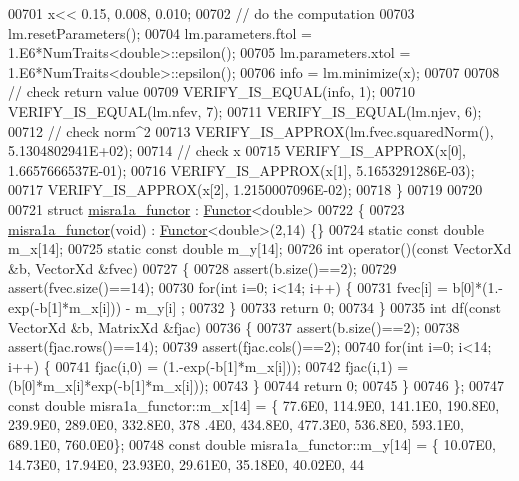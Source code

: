 \begin{DoxyCode}
00701   x<< 0.15, 0.008, 0.010;
00702   \textcolor{comment}{// do the computation}
00703   lm.resetParameters();
00704   lm.parameters.ftol = 1.E6*NumTraits<double>::epsilon();
00705   lm.parameters.xtol = 1.E6*NumTraits<double>::epsilon();
00706   info = lm.minimize(x);
00707 
00708   \textcolor{comment}{// check return value}
00709   VERIFY\_IS\_EQUAL(info, 1);
00710   VERIFY\_IS\_EQUAL(lm.nfev, 7);
00711   VERIFY\_IS\_EQUAL(lm.njev, 6);
00712   \textcolor{comment}{// check norm^2}
00713   VERIFY\_IS\_APPROX(lm.fvec.squaredNorm(), 5.1304802941E+02);
00714   \textcolor{comment}{// check x}
00715   VERIFY\_IS\_APPROX(x[0], 1.6657666537E-01);
00716   VERIFY\_IS\_APPROX(x[1], 5.1653291286E-03);
00717   VERIFY\_IS\_APPROX(x[2], 1.2150007096E-02);
00718 \}
00719 
00720 
00721 \textcolor{keyword}{struct }\hyperlink{structmisra1a__functor}{misra1a\_functor} : \hyperlink{struct_functor}{Functor}<double>
00722 \{
00723     \hyperlink{structmisra1a__functor}{misra1a\_functor}(\textcolor{keywordtype}{void}) : \hyperlink{struct_functor}{Functor}<double>(2,14) \{\}
00724     \textcolor{keyword}{static} \textcolor{keyword}{const} \textcolor{keywordtype}{double} m\_x[14];
00725     \textcolor{keyword}{static} \textcolor{keyword}{const} \textcolor{keywordtype}{double} m\_y[14];
00726     \textcolor{keywordtype}{int} operator()(\textcolor{keyword}{const} VectorXd &b, VectorXd &fvec)
00727     \{
00728         assert(b.size()==2);
00729         assert(fvec.size()==14);
00730         \textcolor{keywordflow}{for}(\textcolor{keywordtype}{int} i=0; i<14; i++) \{
00731             fvec[i] = b[0]*(1.-exp(-b[1]*m\_x[i])) - m\_y[i] ;
00732         \}
00733         \textcolor{keywordflow}{return} 0;
00734     \}
00735     \textcolor{keywordtype}{int} df(\textcolor{keyword}{const} VectorXd &b, MatrixXd &fjac)
00736     \{
00737         assert(b.size()==2);
00738         assert(fjac.rows()==14);
00739         assert(fjac.cols()==2);
00740         \textcolor{keywordflow}{for}(\textcolor{keywordtype}{int} i=0; i<14; i++) \{
00741             fjac(i,0) = (1.-exp(-b[1]*m\_x[i]));
00742             fjac(i,1) = (b[0]*m\_x[i]*exp(-b[1]*m\_x[i]));
00743         \}
00744         \textcolor{keywordflow}{return} 0;
00745     \}
00746 \};
00747 \textcolor{keyword}{const} \textcolor{keywordtype}{double} misra1a\_functor::m\_x[14] = \{ 77.6E0, 114.9E0, 141.1E0, 190.8E0, 239.9E0, 289.0E0, 332.8E0, 378
      .4E0, 434.8E0, 477.3E0, 536.8E0, 593.1E0, 689.1E0, 760.0E0\};
00748 \textcolor{keyword}{const} \textcolor{keywordtype}{double} misra1a\_functor::m\_y[14] = \{ 10.07E0, 14.73E0, 17.94E0, 23.93E0, 29.61E0, 35.18E0, 40.02E0, 44

\end{DoxyCode}
